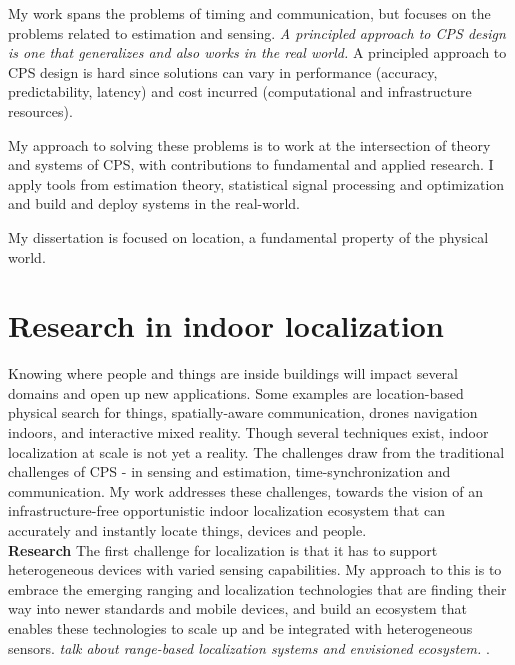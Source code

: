 \documentclass[10pt]{article}
\begin{document}
My work spans the problems of timing and communication, but focuses on the problems related to estimation and sensing. 
\textit{A principled approach to CPS design is one that generalizes and also works in the real world.} 
A principled approach to CPS design is hard since solutions can vary in performance (accuracy, predictability, latency) and cost incurred (computational and infrastructure resources). 

My approach to solving these problems is to work at the intersection of theory and systems of CPS, with contributions to fundamental and applied research. I apply tools from estimation theory, statistical signal processing and optimization and build and deploy systems in the real-world. 


My dissertation is focused on location, a fundamental property of the physical world. %
\section{Research in indoor localization}
Knowing where people and things are inside buildings will impact several domains and open up new applications. Some examples are location-based physical search for things, spatially-aware communication, drones navigation indoors, and interactive mixed reality. Though several techniques exist, indoor localization at scale is not yet a reality. The challenges draw from the traditional challenges of CPS - in sensing and estimation, time-synchronization and communication. My work addresses these challenges, towards the vision of an infrastructure-free opportunistic indoor localization ecosystem that can accurately and instantly locate things, devices and people.\\ %

\textbf{Research}
The first challenge for localization is that it has to support heterogeneous devices with varied sensing capabilities. My approach to this is to
 embrace the emerging ranging and localization technologies that are finding their way into newer standards and mobile devices, and build an ecosystem that enables these technologies to scale up and be integrated with heterogeneous sensors. \textit{talk about range-based localization systems and envisioned ecosystem. }.\\%
\end{document}
